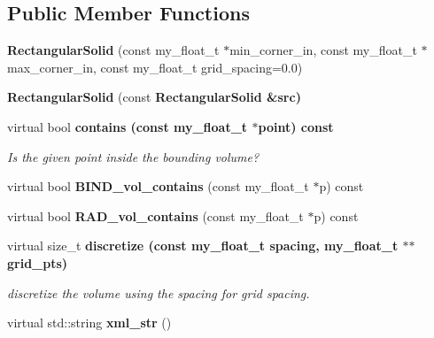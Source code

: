 \subsection*{Public Member Functions}
\begin{CompactItemize}
\item 
\textbf{Rectangular\-Solid} (const my\_\-float\_\-t $\ast$min\_\-corner\_\-in, const my\_\-float\_\-t $\ast$max\_\-corner\_\-in, const my\_\-float\_\-t grid\_\-spacing=0.0)\label{classASCbase_1_1RectangularSolid_6f27151311ea6c7c3036f033e55ce5bb}

\item 
\textbf{Rectangular\-Solid} (const \bf{Rectangular\-Solid} \&src)\label{classASCbase_1_1RectangularSolid_52a293bc179ad6858cf4c7f06937a224}

\item 
virtual bool \bf{contains} (const my\_\-float\_\-t $\ast$point) const \label{classASCbase_1_1RectangularSolid_a9e2c2a9ec3c034f3bba17219a7116c2}

\begin{CompactList}\small\item\em Is the given point inside the bounding volume? \item\end{CompactList}\item 
virtual bool \textbf{BIND\_\-vol\_\-contains} (const my\_\-float\_\-t $\ast$p) const \label{classASCbase_1_1RectangularSolid_3d17933ceada4081756d2e3f4a8bf6d2}

\item 
virtual bool \textbf{RAD\_\-vol\_\-contains} (const my\_\-float\_\-t $\ast$p) const \label{classASCbase_1_1RectangularSolid_888d6eb616e675241d0a3d11fb330a4f}

\item 
virtual size\_\-t \bf{discretize} (const my\_\-float\_\-t spacing, my\_\-float\_\-t $\ast$$\ast$grid\_\-pts)\label{classASCbase_1_1RectangularSolid_39443291990068ad369c9edfc75a4e76}

\begin{CompactList}\small\item\em discretize the volume using the spacing for grid spacing. \item\end{CompactList}\item 
virtual std::string \textbf{xml\_\-str} ()\label{classASCbase_1_1RectangularSolid_a8acf31a229ca25907a0d6cb85da4ec3}

\end{CompactItemize}
